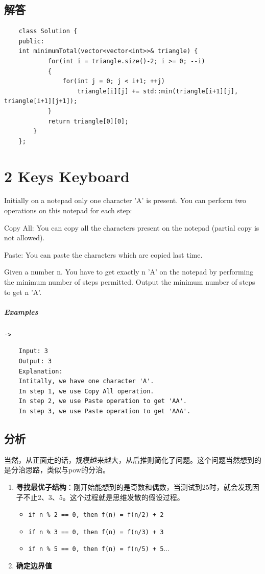\documentclass[UTF8,a4paper,12pt]{ctexbook}
\begin{document}
	\subsection{解答}
		\begin{lstlisting}
	class Solution {
	public:
	int minimumTotal(vector<vector<int>>& triangle) {
			for(int i = triangle.size()-2; i >= 0; --i)
			{
				for(int j = 0; j < i+1; ++j)
					triangle[i][j] += std::min(triangle[i+1][j], triangle[i+1][j+1]);
			}
			return triangle[0][0];
		}
	};
		\end{lstlisting}
\section{2 Keys Keyboard}
	Initially on a notepad only one character 'A' is present. You can perform two operations on this notepad for each step:
	
		Copy All: You can copy all the characters present on the notepad (partial copy is not allowed).
	
		Paste: You can paste the characters which are copied last time.

		Given a number n. You have to get exactly n 'A' on the notepad by performing the minimum number of steps permitted. Output the minimum number of steps to get n 'A'.
	\subparagraph{Examples}\verb|->|
		\begin{lstlisting}
	Input: 3
	Output: 3
	Explanation:
	Intitally, we have one character 'A'.
	In step 1, we use Copy All operation.
	In step 2, we use Paste operation to get 'AA'.
	In step 3, we use Paste operation to get 'AAA'.		
		\end{lstlisting}
	\subsection{分析}
	 当然，从正面走的话，规模越来越大，从后推则简化了问题。这个问题当然想到的是分治思路，类似与pow的分治。
	 
		\begin{enumerate}
			\item \textbf{寻找最优子结构}：刚开始能想到的是奇数和偶数，当测试到25时，就会发现因子不止2、3、5。这个过程就是思维发散的假设过程。
				\begin{itemize}
					\item \verb|if n % 2 == 0, then f(n) = f(n/2) + 2|
					\item \verb|if n % 3 == 0, then f(n) = f(n/3) + 3|
					\item \verb|if n % 5 == 0, then f(n) = f(n/5) + 5|...
				\end{itemize}
			\item \textbf{确定边界值}
		\end{enumerate}
\end{document}

